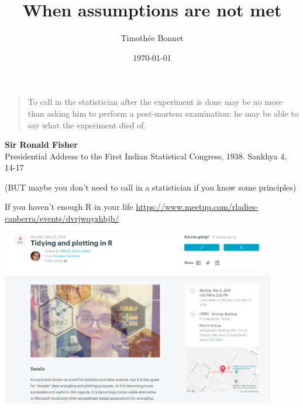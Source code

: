 \documentclass{beamer}\usepackage[]{graphicx}\usepackage[]{color}
\title[Model assumptions]{When assumptions are not met}
\author{Timoth\'ee Bonnet}
\institute[BDSI]{Biological Data Science Institute}
\date{\today}
\begin{document}




\begin{frame}{}

\begin{quote}
To call in the statistician after the experiment is done may be no more than asking him to perform a post-mortem examination: he may be able to say what the experiment died of.
\end{quote}
\textbf{Sir Ronald Fisher} \\ \footnotesize Presidential Address to the First Indian Statistical Congress, 1938. Sankhya 4, 14-17

\vfill
\normalsize
(BUT maybe you don't need to call in a statistician if you know some principles)
\end{frame}


\begin{frame}{}
\maketitle

\end{frame}

\begin{frame}{If you haven't enough R in your life}
\small
\url{https://www.meetup.com/rladies-canberra/events/dvrjwqyzhbjb/}

\includegraphics[width=0.9\textwidth]{Figures/rladies.png}

\end{frame}
\end{document}
